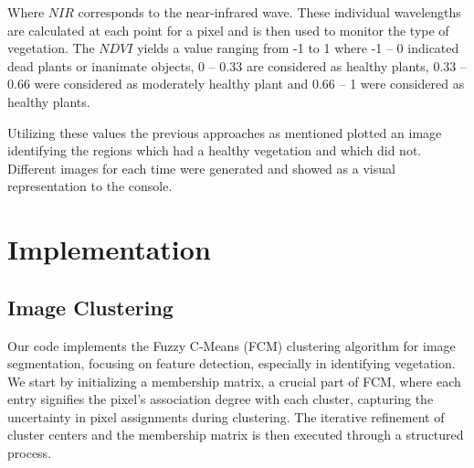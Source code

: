 \documentclass[12pt,a4paper,IEEEtran]{article}
\begin{document}
Where $NIR$ corresponds to the near-infrared wave. These individual wavelengths are calculated at each point for a pixel and is then used to monitor the type of vegetation. The $NDVI$ yields a value ranging from -1 to 1 where -1 – 0 indicated dead plants or inanimate objects, 0 – 0.33 are considered as healthy plants, 0.33 – 0.66 were considered as moderately healthy plant and 0.66 – 1 were considered as healthy plants.  
 
Utilizing these values the previous approaches as mentioned plotted an image identifying the regions which had a healthy vegetation and which did not. Different images for each time were generated and showed as a visual representation to the console. 

 


\section{Implementation}
\subsection{Image Clustering}
Our code implements the Fuzzy C-Means (FCM) clustering algorithm for image segmentation, focusing on feature detection, especially in identifying vegetation. We start by initializing a membership matrix, a crucial part of FCM, where each entry signifies the pixel's association degree with each cluster, capturing the uncertainty in pixel assignments during clustering. The iterative refinement of cluster centers and the membership matrix is then executed through a structured process.  
\end{document}
